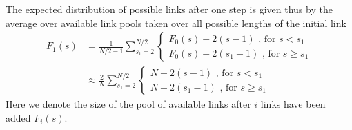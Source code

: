 \documentclass[
reprint,
twocolumn,
amsmath,amssymb,superscriptaddress,aps,
pre]{revtex4-1}
\newcommand{\blue}[1]{\textcolor{blue!80!black}{#1}}
\begin{document}
The expected distribution of possible links after one step is given thus by the average over available link pools taken over all possible lengths of the initial link
\blue{\begin{align}
    F_1(s)&=\frac{1}{N/2-1} \sum_{s_1=2}^{N/2}{ \begin{cases}
    F_0(s)-2(s-1) \text{ , for } s<s_1\\
    F_0(s)-2(s_1 -1)\text{ , for } s\geq s_1
    \end{cases}}
    \nonumber \\
    &\approx\frac{2}{N} \sum_{s_1=2}^{N/2} { \begin{cases}
    N-2(s-1) \text{ , for } s<s_1\\
    N-2(s_1 -1)\text{ , for } s\geq s_1
    \end{cases}}
\end{align}}
Here we denote the size of the pool of available links after $i$ links have been added $F_i(s)$.
\end{document}
